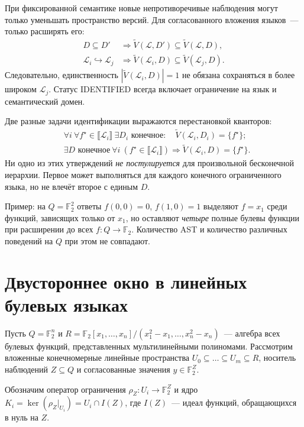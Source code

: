 \documentclass[11pt,a4paper]{article}
\newcommand{\F}{\mathbb{F}}
\newcommand{\sem}[1]{\llbracket #1\rrbracket}
\newcommand{\VS}{\widetilde V}
\newcommand{\vstatus}[1]{\textsf{#1}}
\begin{document}
При фиксированной семантике новые непротиворечивые наблюдения могут только уменьшать пространство версий. Для согласованного вложения языков~--- только расширять его:
\begin{equation}\label{eq:monotonic}
\begin{aligned}
D\subseteq D'&\Longrightarrow\VS(\mathcal L,D')\subseteq\VS(\mathcal L,D),\\
\mathcal L_i\hookrightarrow\mathcal L_j&\Longrightarrow\VS(\mathcal L_i,D)\subseteq\VS(\mathcal L_j,D).
\end{aligned}
\end{equation}
Следовательно, единственность $|\VS(\mathcal L_i,D)|=1$ не обязана сохраняться в более широком $\mathcal L_j$. Статус \vstatus{IDENTIFIED} всегда включает ограничение на язык и семантический домен.

Две разные задачи идентификации выражаются перестановкой кванторов:
\begin{align}\label{eq:quantifiers}
&\forall i\ \forall f^\star\in\sem{\mathcal L_i}\ \exists D_i\text{ конечное}:\quad
 \VS(\mathcal L_i,D_i)=\{f^\star\};\\
&\exists D\text{ конечное}\ \forall i\ (f^\star\in\sem{\mathcal L_i})\Rightarrow
 \VS(\mathcal L_i,D)=\{f^\star\}.
\end{align}
Ни одно из этих утверждений \emph{не постулируется} для произвольной бесконечной иерархии. Первое может выполняться для каждого конечного ограниченного языка, но не влечёт второе с единым $D$.

Пример: на $Q=\F_2^2$ ответы $f(0,0)=0$, $f(1,0)=1$ выделяют $f=x_1$ среди функций, зависящих только от $x_1$, но оставляют \emph{четыре} полные булевы функции при расширении до всех $f:Q\to\F_2$. Количество AST и количество различных поведений на $Q$ при этом не совпадают.

\section{Двустороннее окно в линейных булевых языках}

Пусть $Q=\F_2^n$ и $R=\F_2[x_1,\ldots,x_n]/(x_1^2-x_1,\ldots,x_n^2-x_n)$~--- алгебра всех булевых функций, представленных мультилинейными полиномами. Рассмотрим вложенные конечномерные линейные пространства $U_0\subseteq\dots\subseteq U_m\subseteq R$, носитель наблюдений $Z\subseteq Q$ и согласованные значения $y\in\F_2^Z$.

Обозначим оператор ограничения $\rho_Z:U_i\to\F_2^Z$ и ядро $K_i=\ker(\rho_Z|_{U_i})=U_i\cap I(Z)$, где $I(Z)$~--- идеал функций, обращающихся в нуль на $Z$.
\end{document}

